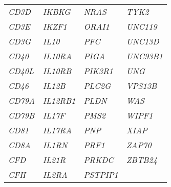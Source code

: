 \begin{center}
\begin{spacing}{1.0}
\begin{longtable}{@{}p{3cm}p{3cm}p{3cm}p{3cm}@{}}
    \textit{CD3D} & \textit{IKBKG} & \textit{NRAS} & \textit{TYK2} \\
    \textit{CD3E} & \textit{IKZF1} & \textit{ORAI1} & \textit{UNC119} \\
    \textit{CD3G} & \textit{IL10} & \textit{PFC} & \textit{UNC13D} \\
    \textit{CD40} & \textit{IL10RA} & \textit{PIGA} & \textit{UNC93B1} \\
    \textit{CD40L} & \textit{IL10RB} & \textit{PIK3R1} & \textit{UNG} \\
    \textit{CD46} & \textit{IL12B} & \textit{PLC2G} & \textit{VPS13B} \\
    \textit{CD79A} & \textit{IL12RB1} & \textit{PLDN} & \textit{WAS} \\
    \textit{CD79B} & \textit{IL17F} & \textit{PMS2} & \textit{WIPF1} \\
    \textit{CD81} & \textit{IL17RA} & \textit{PNP} & \textit{XIAP} \\
    \textit{CD8A} & \textit{IL1RN} & \textit{PRF1} & \textit{ZAP70} \\
    \textit{CFD} & \textit{IL21R} & \textit{PRKDC} & \textit{ZBTB24} \\
    \textit{CFH} & \textit{IL2RA} & \textit{PSTPIP1} & \textit{} \\
    \end{longtable}%
		\end{spacing}
		\end{center}
